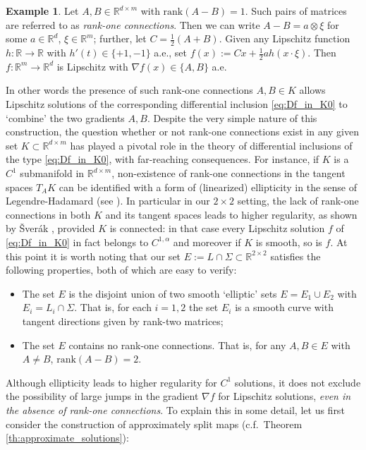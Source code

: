 \documentclass[titlepage]{amsart}
\numberwithin{equation}{section}
\theoremstyle{plain}
\theoremstyle{definition}
\newtheorem{example}[equation]{Example}
\theoremstyle{remark}
\newcommand{\R}{\mathbb{R}}
\newcommand{\g}{\nabla }
\begin{document}
\begin{example}\label{ex:rankoneAB}
Let $A,B\in\R^{d\times m}$ with $\textrm{rank}(A-B)=1$. Such pairs of matrices are referred to as \emph{rank-one connections}. Then we can write $A-B=a\otimes\xi$ for some $a\in \R^d$, $\xi\in \R^m$; further, let $C=\frac{1}{2}(A+B)$. Given any Lipschitz function $h:\R\to\R$ with $h'(t)\in\{+1,-1\}$ a.e., set $f(x):=Cx+\frac12ah(x\cdot\xi)$. Then $f:\R^m\to\R^d$ is Lipschitz with $\g f(x)\in\{A,B\}$ a.e.
\end{example}
In other words the presence of such rank-one connections $A,B\in K$ allows Lipschitz solutions of the corresponding differential inclusion \eqref{eq:Df_in_K0} to `combine' the two gradients $A,B$. Despite the very simple nature of this construction, the question whether or not rank-one connections exist in any given set $K\subset\R^{d\times m}$ has played a pivotal role in the theory of differential inclusions of the type \eqref{eq:Df_in_K0}, with far-reaching consequences. For instance, if $K$ is a $C^1$ submanifold in $\R^{d\times m}$, non-existence of rank-one connections in the tangent spaces $T_AK$ can be identified with a form of (linearized) ellipticity in the sense of Legendre-Hadamard (see \cite{scheffer74,Ball:1980fy,Sverak:1993va,muller_sverak03,muller99,szekelyhidi04,Lorent:2019kv}). In particular in our $2\times 2$ setting, the lack of rank-one connections in both $K$ and its tangent spaces leads to higher regularity, as shown by \v Sver\'ak \cite{Sverak:1993va}, provided $K$ is connected: in that case every Lip\-schitz solution $f$ of \eqref{eq:Df_in_K0} in fact belongs to $C^{1,\alpha}$ and moreover if $K$ is smooth, so is $f$. At this point it is worth noting that our set $E:=L\cap\Sigma\subset\R^{2\times 2}$ satisfies the following properties, both of which are easy to verify:
\begin{itemize}
\item The set $E$ is the disjoint union of two smooth `elliptic' sets $E=E_1\cup E_2$ with $E_i=L_i\cap\Sigma$. That is, for each $i=1,2$ the set $E_i$ is a smooth curve with tangent directions given by rank-two matrices;
\item The set $E$ contains no rank-one connections. That is, for any $A,B\in E$ with $A\neq B$, $\textrm{rank}(A-B)=2$.
\end{itemize}
Although ellipticity leads to higher regularity for $C^1$ solutions, it does not exclude the possibility of large jumps in the gradient $\g f$ for Lipschitz solutions, \emph{even in the absence of rank-one connections}. To explain this in some detail, let us first consider the construction of approximately split maps (c.f.~Theorem \ref{th:approximate_solutions}):
\end{document}
